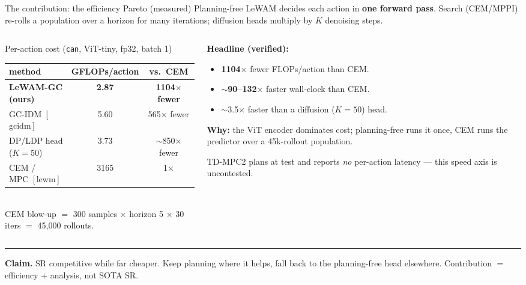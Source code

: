 \documentclass[aspectratio=169,10pt]{beamer}
\begin{document}
\begin{frame}{The contribution: the efficiency Pareto (measured)}
\footnotesize
Planning-free LeWAM decides each action in \textbf{one forward pass}. Search (CEM/MPPI) re-rolls a population over a horizon for many iterations; diffusion heads multiply by $K$ denoising steps.

\vspace{3pt}
\begin{columns}[T]
\begin{column}{0.50\textwidth}
\centering
{\scriptsize Per-action cost (\texttt{can}, ViT-tiny, fp32, batch 1)}\\[2pt]
\setlength{\tabcolsep}{4pt}\renewcommand{\arraystretch}{1.15}
\begin{tabular}{@{}lcc@{}}
\toprule
method & GFLOPs/action & vs.\ CEM \\
\midrule
\textbf{LeWAM-GC (ours)} & \textbf{2.87} & \textbf{1104$\times$ fewer} \\
GC-IDM~[\,gcidm\,] & 5.60 & 565$\times$ fewer \\
DP/LDP head ($K{=}50$) & 3.73 & $\sim$850$\times$ fewer \\
CEM / MPC~[\,lewm\,] & 3165 & 1$\times$ \\
\bottomrule
\end{tabular}\\[3pt]
{\tiny CEM blow-up $=$ 300 samples $\times$ horizon 5 $\times$ 30 iters $=$ 45{,}000 rollouts.}
\end{column}
\begin{column}{0.50\textwidth}
\footnotesize
\textbf{Headline (verified):}
\begin{itemize}\setlength\itemsep{2pt}
  \item \textbf{1104$\times$} fewer FLOPs/action than CEM.
  \item $\sim$\textbf{90--132$\times$} faster wall-clock than CEM.
  \item $\sim$3.5$\times$ faster than a diffusion ($K{=}50$) head.
\end{itemize}
\vspace{2pt}
\textbf{Why:} the ViT encoder dominates cost; planning-free runs it once, CEM runs the predictor over a 45k-rollout population.
\vspace{4pt}

{\scriptsize\color{ours} TD-MPC2 plans at test and reports \emph{no} per-action latency --- this speed axis is uncontested.}
\end{column}
\end{columns}

\vspace{4pt}
\hrule height 0.4pt
\vspace{3pt}
{\footnotesize \textbf{Claim.} SR competitive while far cheaper. Keep planning where it helps, fall back to the planning-free head elsewhere. Contribution $=$ efficiency $+$ analysis, not SOTA SR.}
\end{frame}
\end{document}
